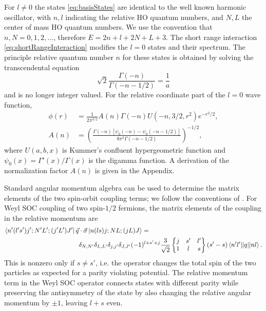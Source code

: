 \documentclass[%
 preprint,
 amsmath,amssymb,
 aps,
]{revtex4-1}
\newcommand{\sixj}[6]{ \begin{Bmatrix}
  #1 & #2 & #3 \\
  #4 & #5 & #6 
 \end{Bmatrix}}
\begin{document}
For $l\neq0$ the states \eqref{eq:basisStates} are identical to the well known harmonic oscillator, with $n,l$ indicating the relative HO quantum numbers, and $N,L$ the center of mass HO quantum numbers. We use the convention that $n,N=0,1,2,\dots$, therefore $E=2n+l+2N+L+3$. The short range interaction \eqref{eq:shortRangeInteraction} modifies the $l=0$ states and their spectrum. The principle relative quantum number $n$ for these states is obtained by solving the transcendental equation
\begin{equation}\label{eq:eigenvalueEqn}
\sqrt{2}\frac{\Gamma(-n)}{\Gamma(-n-1/2)}=\frac{1}{a}
\end{equation}
and is no longer integer valued. For the relative coordinate part of the $l=0$ wave function,
\begin{align}
\phi(r)&=\frac{1}{2\pi^{3/2}}A(n)\Gamma(-n)U(-n,3/2,r^2)e^{-r^2/2}, \label{eq:BuschWF}\\
A(n)&=\left(\frac{\Gamma(-n)[\psi_0(-n)-\psi_0(-n-1/2)]}{8 \pi^2 \Gamma(-n-1/2)}\right)^{-1/2},
\end{align}
where $U(a,b,x)$ is Kummer's confluent hypergeometric function and $\psi_0(x)=\Gamma'(x)/\Gamma(x)$ is the digamma function. A derivation of the normalization factor $A(n)$ is given in the Appendix.

Standard angular momentum algebra can be used to determine the matrix elements of the two spin-orbit coupling terms; we follow the conventions of \cite{Edmonds}. For Weyl SOC coupling of two spin-$1/2$ fermions, the matrix elements of the coupling in the relative momentum are
\begin{equation}\label{eq:WeylRel}\begin{split}
\bra{n'(l's')j';N'L';(j'L')J'}\vec{q}&\cdot\vec{\sigma} \ket{n(ls)j;NL;(jL)J} = \\
&\delta_{N,N'}\delta_{L,L'}\delta_{j,j'}\delta_{J,J'}(-1)^{l+s'+j}\frac{3}{\sqrt{2}}\sixj{j}{s'}{l'}{1}{l}{s} (s'-s)\braket{n'l' || q || n l}.
\end{split}
\end{equation}
This is nonzero only if $s\neq s'$, i.e. the operator changes the total spin of the two particles as expected for a parity violating potential. The relative momentum term in the Weyl SOC operator connects states with different parity while preserving the antisymmetry of the state by also changing the relative angular momentum by $\pm1$, leaving $l+s$ even. 
\end{document}
